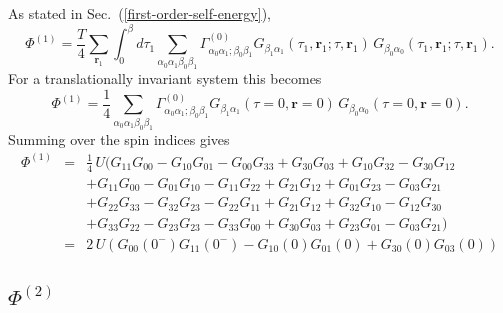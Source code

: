 As stated in Sec.~(\ref{first-order-self-energy}), 
\begin{equation}
\Phi^{(1)} = \frac{T}{4} \sum_{\mathbf{r}_1} \int_0^{\beta}d\tau_1
\sum_{\alpha_0 \alpha_1 \beta_0 \beta_1}
\Gamma^{(0)}_{\alpha_0 \alpha_1; \beta_0 \beta_1}
G_{\beta_1 \alpha_1}(\tau_1,\mathbf{r}_1;\tau,\mathbf{r}_1)
\,G_{\beta_0 \alpha_0}(\tau_1,\mathbf{r}_1;\tau,\mathbf{r}_1).
\end{equation}
For a translationally invariant system this becomes
\begin{equation}
\Phi^{(1)} = \frac{1}{4}\sum_{\alpha_0 \alpha_1\beta_0 \beta_1}
\Gamma^{(0)}_{\alpha_0 \alpha_1; \beta_0 \beta_1}
G_{\beta_1 \alpha_1}(\tau=0,\mathbf{r}=0)\,
G_{\beta_0 \alpha_0}(\tau=0,\mathbf{r}=0).
\end{equation} 
Summing over the spin indices gives
\begin{eqnarray}
\Phi^{(1)} & = & \frac{1}{4}\, U ( 
G_{11}G_{00} - G_{10}G_{01} - G_{00}G_{33} 
+ G_{30}G_{03} + G_{10}G_{32} - G_{30}G_{12} \\
\nonumber
& & + G_{11}G_{00} - G_{01}G_{10} - G_{11}G_{22} 
+ G_{21}G_{12} + G_{01}G_{23} - G_{03}G_{21} \\
\nonumber
& & + G_{22}G_{33} - G_{32}G_{23} - G_{22}G_{11}
+ G_{21}G_{12} + G_{32}G_{10} - G_{12}G_{30} \\
\nonumber
& &+ G_{33}G_{22} - G_{23}G_{23} - G_{33}G_{00}
+ G_{30}G_{03} + G_{23}G_{01} - G_{03}G_{21} 
) \\
& = & 2\, U \left(G_{00}(0^-)G_{11}(0^-) -
 G_{10}(0)G_{01}(0) + G_{30}(0)G_{03}(0) \right)
\end{eqnarray}

\subsection{$\Phi^{(2)}$}

